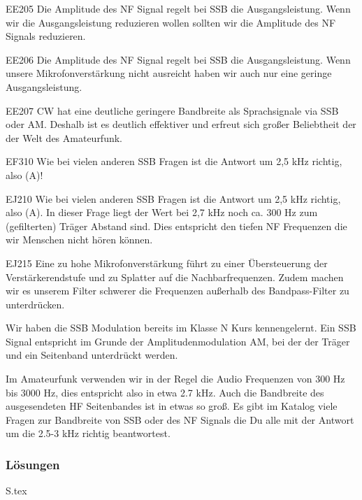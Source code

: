 \documentclass[10pt,a4paper,ngerman]{article}
\theoremstyle{definition}
\theoremstyle{plain}
\theoremstyle{mytheorem}
\theoremstyle{definition}
\newcommand{\pic}[2][1]{%
\begin{center}
    \begin{tikzpicture}[scale=#1]
                
    \end{tikzpicture}
\end{center}    
}
\newenvironment{ohmchapter}{}
{
  \subsubsection*{Lösungen}
  S\arabic{subsection}.tex}
}
\begin{document}
\begin{sol}{EE205}
  Die Amplitude des NF Signal regelt bei SSB die Ausgangsleistung. Wenn wir die Ausgangsleistung reduzieren wollen sollten wir die Amplitude des NF Signals reduzieren.
\end{sol}
\begin{sol}{EE206}
  Die Amplitude des NF Signal regelt bei SSB die Ausgangsleistung. Wenn unsere Mikrofonverstärkung nicht ausreicht haben wir auch nur eine geringe Ausgangsleistung.
\end{sol}
\begin{sol}{EE207}
  CW hat eine deutliche geringere Bandbreite als Sprachsignale via SSB oder AM. Deshalb ist es deutlich effektiver und erfreut sich großer Beliebtheit der der Welt des Amateurfunk.
\end{sol}

\begin{sol}{EF310}
Wie bei vielen anderen SSB Fragen ist die Antwort um 2,5 kHz richtig, also (A)!
\end{sol}


\begin{sol}{EJ210}
Wie bei vielen anderen SSB Fragen ist die Antwort um 2,5 kHz richtig, also (A). In dieser Frage liegt der Wert bei 2,7 kHz noch ca. 300 Hz zum (gefilterten) Träger Abstand sind. Dies entspricht den tiefen NF Frequenzen die wir Menschen nicht hören können.
\end{sol}

\begin{sol}{EJ215}
 Eine zu hohe Mikrofonverstärkung führt zu einer Übersteuerung der Verstärkerendstufe und zu Splatter auf die Nachbarfrequenzen.  Zudem machen wir es unserem Filter schwerer die Frequenzen außerhalb des Bandpass-Filter zu unterdrücken.
\end{sol}

\begin{ohmchapter}
  Wir haben die SSB Modulation bereits im Klasse N Kurs kennengelernt. Ein SSB Signal entspricht im Grunde der Amplitudenmodulation AM, bei der der Träger und ein Seitenband unterdrückt werden.
  
  Im Amateurfunk verwenden wir in der Regel die Audio Frequenzen von 300 Hz bis 3000 Hz, dies entspricht also in etwa 2.7 kHz. Auch die Bandbreite des ausgesendeten HF Seitenbandes ist in etwas so groß. Es gibt im Katalog viele Fragen zur Bandbreite von SSB oder des NF Signals die Du alle mit der Antwort um die 2.5-3 kHz richtig beantwortest.
  \pic[1.3]{ssb}
\end{ohmchapter}  
\end{document}
